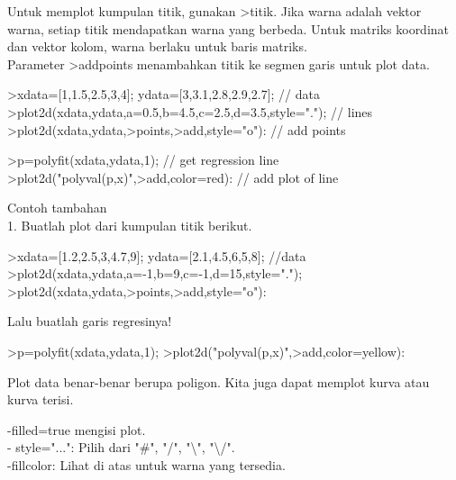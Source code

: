 \documentclass[12pt,arial,letterpaper]{book}
\begin{document}
\begin{eulercomment}
\begin{eulercomment}
\begin{eulercomment}
\begin{eulercomment}
\begin{eulercomment}
\begin{eulercomment}
\begin{eulercomment}
\begin{eulercomment}
\begin{eulercomment}
\begin{eulercomment}
\begin{eulercomment}
\begin{eulercomment}
\begin{eulercomment}
\begin{eulercomment}
\begin{eulercomment}
\begin{eulercomment}
\begin{eulercomment}
Untuk memplot kumpulan titik, gunakan \textgreater{}titik. Jika warna adalah vektor
warna, setiap titik mendapatkan warna yang berbeda. Untuk matriks
koordinat dan vektor kolom, warna berlaku untuk baris matriks.\\
Parameter \textgreater{}addpoints menambahkan titik ke segmen garis untuk plot
data.
\end{eulercomment}
\begin{eulerprompt}
>xdata=[1,1.5,2.5,3,4]; ydata=[3,3.1,2.8,2.9,2.7]; // data
>plot2d(xdata,ydata,a=0.5,b=4.5,c=2.5,d=3.5,style="."); // lines
>plot2d(xdata,ydata,>points,>add,style="o"): // add points
\end{eulerprompt}
\begin{eulerprompt}
>p=polyfit(xdata,ydata,1); // get regression line
>plot2d("polyval(p,x)",>add,color=red): // add plot of line
\end{eulerprompt}
\begin{eulercomment}
Contoh tambahan\\
1. Buatlah plot dari kumpulan titik berikut.
\end{eulercomment}
\begin{eulerprompt}
>xdata=[1.2,2.5,3,4.7,9]; ydata=[2.1,4.5,6,5,8]; //data
>plot2d(xdata,ydata,a=-1,b=9,c=-1,d=15,style="."); 
>plot2d(xdata,ydata,>points,>add,style="o"):
\end{eulerprompt}
\begin{eulercomment}
Lalu buatlah garis regresinya!
\end{eulercomment}
\begin{eulerprompt}
>p=polyfit(xdata,ydata,1);
>plot2d("polyval(p,x)",>add,color=yellow):
\end{eulerprompt}
\begin{eulercomment}
Plot data benar-benar berupa poligon. Kita juga dapat memplot kurva
atau kurva terisi.

-filled=true mengisi plot.\\
- style="...": Pilih dari "#", "/", "\textbackslash{}", "\textbackslash{}/".\\
-fillcolor: Lihat di atas untuk warna yang tersedia.


\end{eulercomment}
\end{eulercomment}
\end{eulercomment}
\end{eulercomment}
\end{eulercomment}
\end{eulercomment}
\end{eulercomment}
\end{eulercomment}
\end{eulercomment}
\end{eulercomment}
\end{eulercomment}
\end{eulercomment}
\end{eulercomment}
\end{eulercomment}
\end{eulercomment}
\end{eulercomment}
\end{eulercomment}
\end{document}
